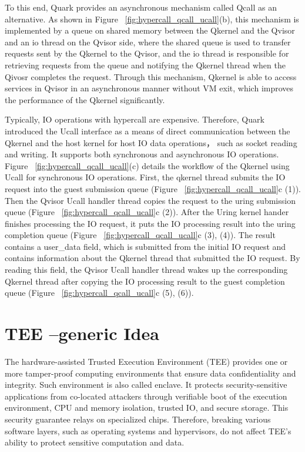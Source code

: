 To this end, Quark provides an asynchronous mechanism called Qcall as an alternative. 
As shown in Figure ~\ref{fig:hypercall_qcall_ucall}(b), this mechanism is implemented by a queue on shared memory between the Qkernel and the Qvisor and an io thread on the Qvisor side, where the
shared queue is used to transfer requests sent by the Qkernel to the Qvisor, and the io thread is responsible for retrieving requests from the queue and notifying the Qkernel thread when the Qivosr completes 
the request. Through this mechanism, Qkernel is able to access services in Qvisor in an asynchronous manner without VM exit, which improves the performance of the Qkernel significantly.

Typically, IO operations with hypercall are expensive. Therefore, Quark introduced the Ucall interface as a means of direct communication between the Qkernel and the host kernel for host 
IO data operations，  such as socket reading and writing. It supports both synchronous and asynchronous IO operations. Figure ~\ref{fig:hypercall_qcall_ucall}(c) details the workflow of the Qkernel 
using Ucall for synchronous IO operations. First, the qkernel thread submits the IO request into the guest submission queue (Figure ~\ref{fig:hypercall_qcall_ucall}c (1)). Then the Qvisor Ucall handler thread copies the request to the uring submission 
queue (Figure ~\ref{fig:hypercall_qcall_ucall}c (2)). After the Uring kernel hander finishes processing the IO request, it puts the IO processing result into the uring completion queue (Figure ~\ref{fig:hypercall_qcall_ucall}c (3), (4)). The result 
contains a user\_data field, which is submitted from the initial IO request and contains information about the Qkernel thread that submitted the IO request. By reading this field, the Qvisor Ucall handler thread wakes up the corresponding Qkernel thread 
after copying the IO processing result to the guest completion queue (Figure ~\ref{fig:hypercall_qcall_ucall}c (5), (6)).



\section{TEE --generic Idea}
The hardware-assisted Trusted Execution Environment (TEE) provides one or more tamper-proof computing environments that ensure data confidentiality and integrity. Such environment is also called enclave. It protects security-sensitive applications from co-located attackers 
through verifiable boot of the execution environment, CPU and memory isolation, trusted IO, and secure storage\cite*{Hardware-supported-TEE}. This security guarantee relays on specialized chips. Therefore, breaking various software layers,
such as operating systems and hypervisors, do not affect TEE's ability to protect sensitive computation and data\cite*{7345265}.


